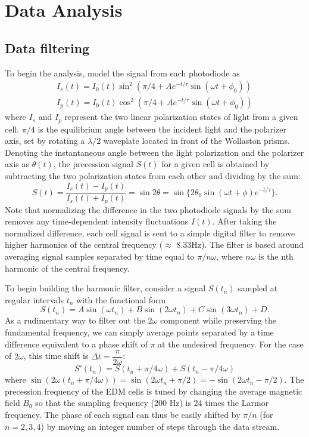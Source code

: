 \documentclass [10pt, twoside] {uwthesis}[2012/04/02]
\begin{document}
\cleardoublepage

\chapter{Data Analysis}
\section{Data filtering}
\label{Digital_filter}
To begin the analysis, model the signal from each photodiode as 
\begin{align}
I_s(t) = I_0(t) \sin^2(\pi/4 + Ae^{-t/\tau}\sin(\omega t + \phi_0)) \\
I_p(t) = I_0(t) \cos^2(\pi/4 + Ae^{-t/\tau}\sin(\omega t + \phi_0)) 
\end{align}
where $I_s$ and $I_p$ represent the two linear polarization states of light from a given cell. $\pi/4$ is the equilibrium angle between the incident light and the polarizer axis, set by rotating a $\lambda/2$ waveplate located in front of the Wollaston prisms. Denoting the instantaneous angle between the light polarization and the polarizer axis as $\theta(t)$, the precession signal $S(t)$ for a given cell is obtained by subtracting the two polarization states from each other and dividing by the sum:
\begin{equation}
S(t) = \frac{I_s(t)-I_p(t)}{I_s(t)+I_p(t)} = \sin{2\theta} = \sin\lbrace 2\theta_0 \sin(\omega t + \phi) e^{-t/\tau}\rbrace. 
\end{equation}
Note that normalizing the difference in the two photodiode signals by the sum removes any time-dependent intensity fluctuations $I(t)$. After taking the normalized difference, each cell signal is sent to a simple digital filter to remove higher harmonics of the central frequency ($\approx$ 8.33Hz). The filter is based around averaging signal samples separated by time equal to $\pi/n\omega$, where $n\omega$ is the nth harmonic of the central frequency.

To begin building the harmonic filter, consider a signal $S(t_n)$ sampled at regular intervals $t_n$ with the functional form
\begin{equation} \label{S}
S(t_n) = A \sin(\omega t_n) + B \sin(2\omega t_n) + C \sin(3\omega t_n) + D. 
\end{equation}
As a rudimentary way to filter out the $2\omega$ component while preserving the fundamental frequency, we can simply average points separated by a time difference equivalent to a phase shift of $\pi$ at the undesired frequency. For the case of $2\omega$, this time shift is $\Delta t = \dfrac{\pi}{2\omega}$: 
\begin{equation}
S'(t_n) = S(t_n + \pi/4\omega) + S(t_n - \pi/4\omega)
\end{equation}
where $\sin(2\omega (t_n + \pi/4\omega)) = \sin(2\omega t_n + \pi/2) = - \sin(2\omega t_n - \pi/2).$ The precession frequency of the EDM cells is tuned by changing the average magnetic field $B_0$ so that the sampling frequency (200 Hz) is 24 times the Larmor frequency. The phase of each signal can thus be easily shifted by $\pi/n $ (for $n=2,3,4$) by moving an integer number of steps through the data stream.
\end{document}
